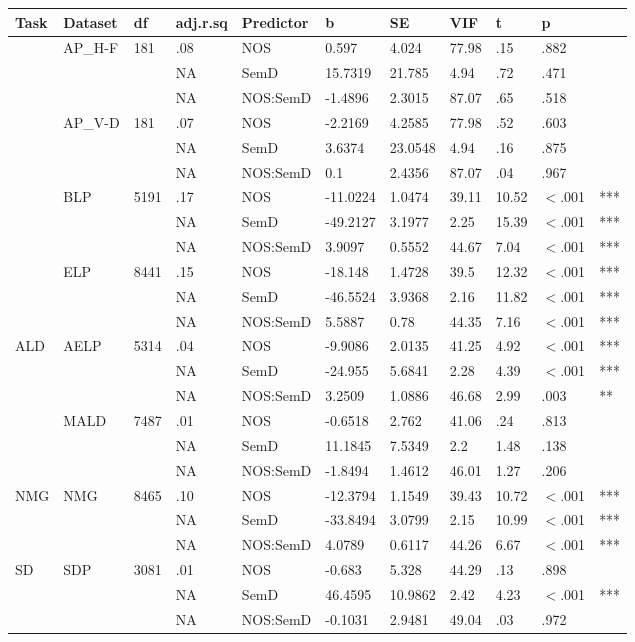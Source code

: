 \begin{table}[ht]
\centering
\begingroup\normalsize
\begin{tabular}{lllllllllll}
  \hline
Task & Dataset & df & adj.r.sq & Predictor & b & SE & VIF & t & p &  \\ 
  \hline
 & AP\_H-F & 181 & .08 & NOS & 0.597 & 4.024 & 77.98 & .15 & .882 &   \\ 
   &  &  & NA & SemD & 15.7319 & 21.785 & 4.94 & .72 & .471 &   \\ 
   &  &  & NA & NOS:SemD & -1.4896 & 2.3015 & 87.07 & .65 & .518 &   \\ 
   & AP\_V-D & 181 & .07 & NOS & -2.2169 & 4.2585 & 77.98 & .52 & .603 &   \\ 
   &  &  & NA & SemD & 3.6374 & 23.0548 & 4.94 & .16 & .875 &   \\ 
   &  &  & NA & NOS:SemD & 0.1 & 2.4356 & 87.07 & .04 & .967 &   \\ 
   & BLP & 5191 & .17 & NOS & -11.0224 & 1.0474 & 39.11 & 10.52 & $<$.001 & *** \\ 
   &  &  & NA & SemD & -49.2127 & 3.1977 & 2.25 & 15.39 & $<$.001 & *** \\ 
   &  &  & NA & NOS:SemD & 3.9097 & 0.5552 & 44.67 & 7.04 & $<$.001 & *** \\ 
   & ELP & 8441 & .15 & NOS & -18.148 & 1.4728 & 39.5 & 12.32 & $<$.001 & *** \\ 
   &  &  & NA & SemD & -46.5524 & 3.9368 & 2.16 & 11.82 & $<$.001 & *** \\ 
   &  &  & NA & NOS:SemD & 5.5887 & 0.78 & 44.35 & 7.16 & $<$.001 & *** \\ 
  ALD & AELP & 5314 & .04 & NOS & -9.9086 & 2.0135 & 41.25 & 4.92 & $<$.001 & *** \\ 
   &  &  & NA & SemD & -24.955 & 5.6841 & 2.28 & 4.39 & $<$.001 & *** \\ 
   &  &  & NA & NOS:SemD & 3.2509 & 1.0886 & 46.68 & 2.99 & .003 & ** \\ 
   & MALD & 7487 & .01 & NOS & -0.6518 & 2.762 & 41.06 & .24 & .813 &   \\ 
   &  &  & NA & SemD & 11.1845 & 7.5349 & 2.2 & 1.48 & .138 &   \\ 
   &  &  & NA & NOS:SemD & -1.8494 & 1.4612 & 46.01 & 1.27 & .206 &   \\ 
  NMG & NMG & 8465 & .10 & NOS & -12.3794 & 1.1549 & 39.43 & 10.72 & $<$.001 & *** \\ 
   &  &  & NA & SemD & -33.8494 & 3.0799 & 2.15 & 10.99 & $<$.001 & *** \\ 
   &  &  & NA & NOS:SemD & 4.0789 & 0.6117 & 44.26 & 6.67 & $<$.001 & *** \\ 
  SD & SDP & 3081 & .01 & NOS & -0.683 & 5.328 & 44.29 & .13 & .898 &   \\ 
   &  &  & NA & SemD & 46.4595 & 10.9862 & 2.42 & 4.23 & $<$.001 & *** \\ 
   &  &  & NA & NOS:SemD & -0.1031 & 2.9481 & 49.04 & .03 & .972 &   \\ 
   \hline
\end{tabular}
\endgroup
\end{table}
